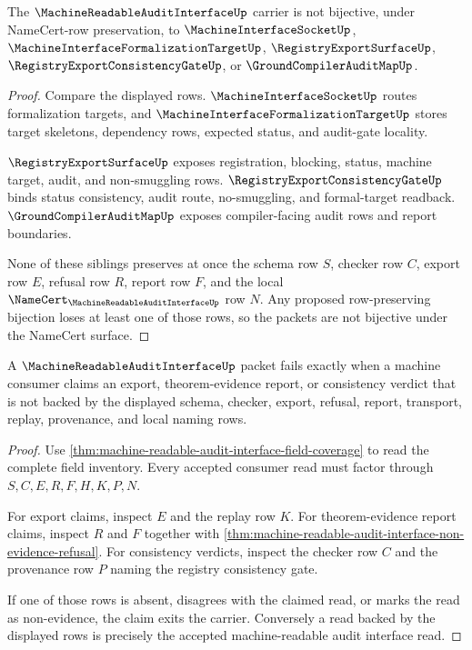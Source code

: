 \begin{theorem}
\label{thm:machine-readable-audit-interface-sibling-independence}
The $\MachineReadableAuditInterfaceUp$ carrier is not bijective, under NameCert-row preservation, to $\MachineInterfaceSocketUp$, $\MachineInterfaceFormalizationTargetUp$, $\RegistryExportSurfaceUp$, $\RegistryExportConsistencyGateUp$, or $\GroundCompilerAuditMapUp$.
\end{theorem}
\begin{proof}
Compare the displayed rows. $\MachineInterfaceSocketUp$ routes formalization targets, and $\MachineInterfaceFormalizationTargetUp$ stores target skeletons, dependency rows, expected status, and audit-gate locality.

$\RegistryExportSurfaceUp$ exposes registration, blocking, status, machine target, audit, and non-smuggling rows. $\RegistryExportConsistencyGateUp$ binds status consistency, audit route, no-smuggling, and formal-target readback. $\GroundCompilerAuditMapUp$ exposes compiler-facing audit rows and report boundaries.

None of these siblings preserves at once the schema row $S$, checker row $C$, export row $E$, refusal row $R$, report row $F$, and the local $\NameCert_{\MachineReadableAuditInterfaceUp}$ row $N$. Any proposed row-preserving bijection loses at least one of those rows, so the packets are not bijective under the NameCert surface.
\end{proof}

\begin{theorem}
\label{thm:machine-readable-audit-interface-falsifiable-prediction}
A $\MachineReadableAuditInterfaceUp$ packet fails exactly when a machine consumer claims an export, theorem-evidence report, or consistency verdict that is not backed by the displayed schema, checker, export, refusal, report, transport, replay, provenance, and local naming rows.
\end{theorem}
\begin{proof}
Use \autoref{thm:machine-readable-audit-interface-field-coverage} to read the complete field inventory. Every accepted consumer read must factor through $S,C,E,R,F,H,K,P,N$.

For export claims, inspect $E$ and the replay row $K$. For theorem-evidence report claims, inspect $R$ and $F$ together with \autoref{thm:machine-readable-audit-interface-non-evidence-refusal}. For consistency verdicts, inspect the checker row $C$ and the provenance row $P$ naming the registry consistency gate.

If one of those rows is absent, disagrees with the claimed read, or marks the read as non-evidence, the claim exits the carrier. Conversely a read backed by the displayed rows is precisely the accepted machine-readable audit interface read.
\end{proof}

